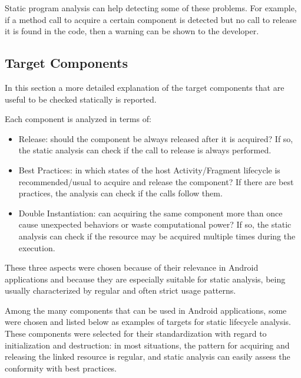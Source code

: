 \documentclass[11pt,a4paper,notitlepage]{article}
\begin{document}
Static program analysis can help detecting some of these problems. For example, if a method call to acquire a certain component is detected but no call to release it is found in the code, then a warning can be shown to the developer.

\subsection{Target Components}
In this section a more detailed explanation of the target components that are useful to be checked statically is reported.

Each component is analyzed in terms of:
\begin{itemize}
	\item Release: should the component be always released after it is acquired? If so, the static analysis can check if the call to release is always performed.
	\item Best Practices: in which states of the host Activity/Fragment lifecycle is recommended/usual to acquire and release the component? If there are best practices, the analysis can check if the calls follow them.
	\item Double Instantiation: can acquiring the same component more than once cause unexpected behaviors or waste computational power? If so, the static analysis can check if the resource may be acquired multiple times during the execution.
\end{itemize}
These three aspects were chosen because of their relevance in Android applications and because they are especially suitable for static analysis, being usually characterized by regular and often strict usage patterns.

Among the many components that can be used in Android applications, some were chosen and listed below as examples of targets for static lifecycle analysis. These components were selected for their standardization with regard to initialization and destruction: in most situations, the pattern for acquiring and releasing the linked resource is regular, and static analysis can easily assess the conformity with best practices.
\end{document}
